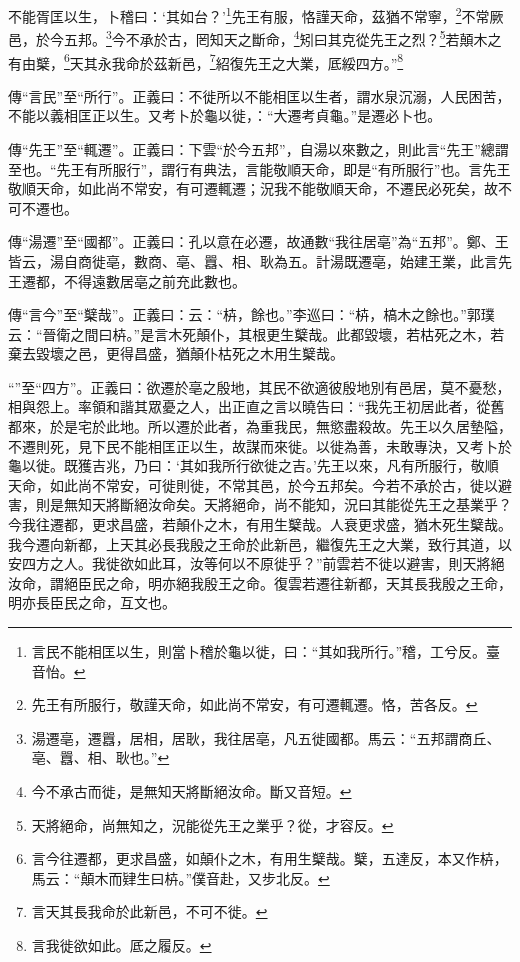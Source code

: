 不能胥匡以生，卜稽曰：‘其如台？’\footnote{言民不能相匡以生，則當卜稽於龜以徙，曰：“其如我所行。”稽，工兮反。臺音怡。}先王有服，恪謹天命，茲猶不常寧，\footnote{先王有所服行，敬謹天命，如此尚不常安，有可遷輒遷。恪，苦各反。}不常厥邑，於今五邦。\footnote{湯遷亳，遷囂，居相，居耿，我往居亳，凡五徙國都。馬云：“五邦謂商丘、亳、囂、相、耿也。”}今不承於古，罔知天之斷命，\footnote{今不承古而徙，是無知天將斷絕汝命。斷又音短。}矧曰其克從先王之烈？\footnote{天將絕命，尚無知之，況能從先王之業乎？從，才容反。}若顛木之有由櫱，\footnote{言今往遷都，更求昌盛，如顛仆之木，有用生櫱哉。櫱，五達反，本又作枿，馬云：“顛木而肄生曰枿。”僕音赴，又步北反。}天其永我命於茲新邑，\footnote{言天其長我命於此新邑，不可不徙。}紹復先王之大業，厎綏四方。”\footnote{言我徙欲如此。厎之履反。}

{\noindent\zhuan{}\fzbyks 傳“言民”至“所行”。正義曰：不徙所以不能相匡以生者，謂水泉沉溺，人民困苦，不能以義相匡正以生。又考卜於龜以徙，：“大遷考貞龜。”是遷必卜也。 \par}

{\noindent\zhuan{}\fzbyks 傳“先王”至“輒遷”。正義曰：下雲“於今五邦”，自湯以來數之，則此言“先王”總謂至也。“先王有所服行”，謂行有典法，言能敬順天命，即是“有所服行”也。言先王敬順天命，如此尚不常安，有可遷輒遷；況我不能敬順天命，不遷民必死矣，故不可不遷也。 \par}

{\noindent\zhuan{}\fzbyks 傳“湯遷”至“國都”。正義曰：孔以意在必遷，故通數“我往居亳”為“五邦”。鄭、王皆云，湯自商徙亳，數商、亳、囂、相、耿為五。計湯既遷亳，始建王業，此言先王遷都，不得遠數居亳之前充此數也。 \par}

{\noindent\zhuan{}\fzbyks 傳“言今”至“櫱哉”。正義曰：云：“枿，餘也。”李巡曰：“枿，槁木之餘也。”郭璞云：“晉衛之間曰枿。”是言木死顛仆，其根更生櫱哉。此都毀壞，若枯死之木，若棄去毀壞之邑，更得昌盛，猶顛仆枯死之木用生櫱哉。 \par}

{\noindent\shu{}\fzkt “”至“四方”。正義曰：欲遷於亳之殷地，其民不欲適彼殷地別有邑居，莫不憂愁，相與怨上。率領和諧其眾憂之人，出正直之言以曉告曰：“我先王初居此者，從舊都來，於是宅於此地。所以遷於此者，為重我民，無慾盡殺故。先王以久居墊隘，不遷則死，見下民不能相匡正以生，故謀而來徙。以徙為善，未敢專決，又考卜於龜以徙。既獲吉兆，乃曰：‘其如我所行欲徙之吉。’先王以來，凡有所服行，敬順天命，如此尚不常安，可徙則徙，不常其邑，於今五邦矣。今若不承於古，徙以避害，則是無知天將斷絕汝命矣。天將絕命，尚不能知，況曰其能從先王之基業乎？今我往遷都，更求昌盛，若顛仆之木，有用生櫱哉。人衰更求盛，猶木死生櫱哉。我今遷向新都，上天其必長我殷之王命於此新邑，繼復先王之大業，致行其道，以安四方之人。我徙欲如此耳，汝等何以不原徙乎？”前雲若不徙以避害，則天將絕汝命，謂絕臣民之命，明亦絕我殷王之命。復雲若遷往新都，天其長我殷之王命，明亦長臣民之命，互文也。 \par}

